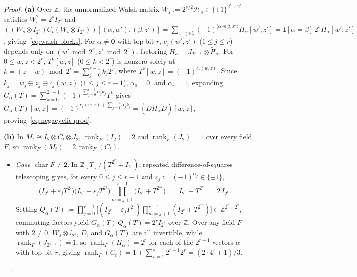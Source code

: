 \documentclass[11pt,reqno]{amsart}
\theoremstyle{definition}
\theoremstyle{remark}
\DeclareMathOperator{\rk}{rank}
\newcommand{\FF}{\mathbb{F}}
\newcommand{\ZZ}{\mathbb{Z}}
\newcommand{\ind}{\mathbf{1}}
\newcommand{\zero}{\mathbf{0}}
\numberwithin{equation}{section}
\begin{document}
\begin{proof}
\textbf{(a)} Over $\ZZ$, the unnormalized Walsh matrix $W_s := 2^{s/2}\mathcal{H}_s \in \{\pm 1\}^{2^s \times 2^s}$ satisfies $W_s^2 = 2^s I_{2^s}$ and $((W_s \otimes I_{2^s}) C_t (W_s \otimes I_{2^s}))[(\alpha, w'), (\beta, z')] = \sum_{x' \in \FF_2^s} (-1)^{\langle \alpha \oplus \beta, x' \rangle} H_\alpha[w', z'] = \ind[\alpha = \beta]\,2^s H_\alpha[w', z']$, giving~\eqref{eq:walsh-blocks}. For $\alpha \neq \zero$ with top bit $r$, $c_j(w', z')$ ($1 \le j \le r$) depends only on $(w' \bmod 2^r, z' \bmod 2^r)$, factoring $H_\alpha = J_{2^{s-r}} \otimes \widetilde{H}_\alpha$. For $0 \le w, z < 2^r$, $T^k[w, z]$ ($0 \le k < 2^r$) is nonzero solely at $k = (z - w) \bmod 2^r = \sum_{j=0}^{r-1} k_j 2^j$, where $T^k[w, z] = (-1)^{c_r(w, z)}$. Since $k_j = w_j \oplus z_j \oplus c_j(w, z)$ ($1 \le j \le r - 1$), $\alpha_0 = 0$, and $\alpha_r = 1$, expanding $G_\alpha(T) = \sum_{k=0}^{2^r-1}(-1)^{\sum_{j=0}^{r-1}\alpha_j k_j} T^k$ gives $G_\alpha(T)[w, z] = (-1)^{c_r(w,z) + \sum_{j=1}^{r-1}\alpha_j k_j} = (D\widetilde{H}_\alpha D)[w, z]$, proving~\eqref{eq:negacyclic-prod}.

\medskip
\noindent\textbf{(b)} In $M_t \cong I_2 \otimes C_t \otimes J_2$, $\rk_F(I_2) = 2$ and $\rk_F(J_2) = 1$ over every field $F$, so $\rk_F(M_t) = 2\,\rk_F(C_t)$.
\begin{itemize}[leftmargin=2em]
  \item \emph{Case $\operatorname{char} F \neq 2$:} In $\ZZ[T]/(T^{2^r} + I_{2^r})$, repeated difference-of-squares telescoping gives, for every $0 \le j \le r - 1$ and $\varepsilon_j := (-1)^{\alpha_j} \in \{\pm 1\}$,
  \begin{equation}
    \label{eq:int-telescope}
    \bigl(I_{2^r} + \varepsilon_j T^{2^j}\bigr)\bigl(I_{2^r} - \varepsilon_j T^{2^j}\bigr)\prod_{m=j+1}^{r-1}\bigl(I_{2^r} + T^{2^m}\bigr)
    \;=\; I_{2^r} - T^{2^r} \;=\; 2\,I_{2^r}.
  \end{equation}
  Setting $Q_\alpha(T) := \prod_{j=0}^{r-1}\bigl[(I_{2^r} - \varepsilon_j T^{2^j})\prod_{m=j+1}^{r-1}(I_{2^r} + T^{2^m})\bigr] \in \ZZ^{2^r \times 2^r}$, commuting factors yield $G_\alpha(T)\,Q_\alpha(T) = 2^r I_{2^r}$ over $\ZZ$. Over any field $F$ with $2 \neq 0$, $W_s \otimes I_{2^s}$, $D$, and $G_\alpha(T)$ are all invertible, while $\rk_F(J_{2^{s-r}}) = 1$, so $\rk_F(H_\alpha) = 2^r$ for each of the $2^{r-1}$ vectors $\alpha$ with top bit $r$, giving $\rk_F(C_t) = 1 + \sum_{r=1}^s 2^{r-1} 2^r = (2\cdot 4^s + 1)/3$.


\end{itemize}
\end{proof}
\end{document}
